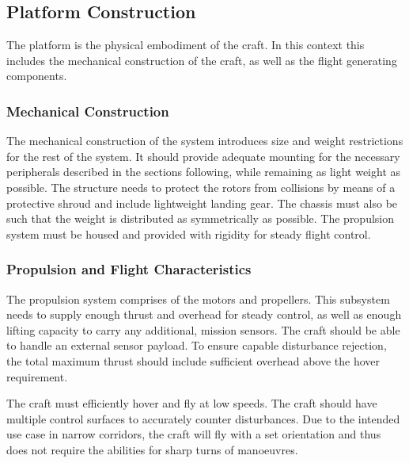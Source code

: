		\subsection{Platform Construction}
		The platform is the physical embodiment of the craft. In this context this includes the mechanical construction of the craft, as well as the flight generating components.
		
			\subsubsection{Mechanical Construction}
			The mechanical construction of the system introduces size and weight restrictions for the rest of the system. It should provide adequate mounting for the necessary peripherals described in the sections following, while remaining as light weight as possible. The structure needs to protect the rotors from collisions by means of a protective shroud and include lightweight landing gear. The chassis must also be such that the weight is distributed as symmetrically as possible. The propulsion system must be housed and provided with rigidity for steady flight control.
			
			\subsubsection{Propulsion and Flight Characteristics}
			The propulsion system comprises of the motors and propellers. This subsystem needs to supply enough thrust and overhead for steady control, as well as enough lifting capacity to carry any additional, mission sensors. The craft should be able to handle an external sensor payload. To ensure capable disturbance rejection, the total maximum thrust should include sufficient overhead above the hover requirement.
			
			The craft must efficiently hover and fly at low speeds. The craft should have multiple control surfaces to accurately counter disturbances. Due to the intended use case in narrow corridors, the craft will fly with a set orientation and thus does not require the abilities for sharp turns of manoeuvres.	
		
